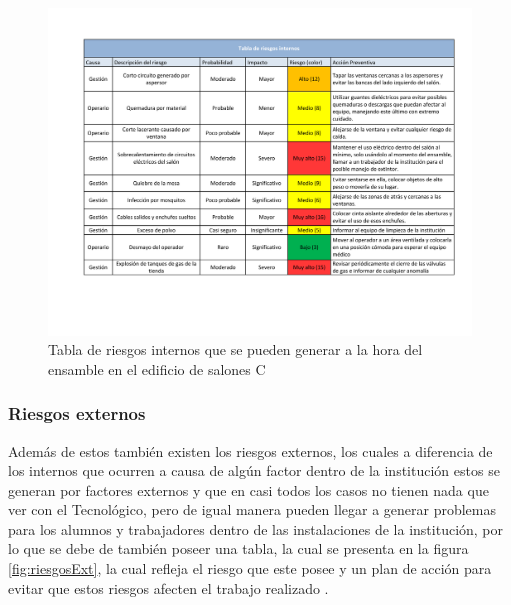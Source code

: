     \begin{figure}[H]
        \centering
        \includegraphics[trim = {20mm 15mm 10mm 20mm},clip,scale=0.35]{19/Img/riesgosInt.pdf}
        \caption{Tabla de riesgos internos que se pueden generar a la hora del ensamble en el edificio de salones C}
        \label{fig:riesgosInt}
    \end{figure}
    
    \subsubsection{Riesgos externos}

     Además de estos también existen los riesgos externos, los cuales a diferencia de los internos que ocurren a causa de algún factor dentro de la institución estos se generan por factores externos y que en casi todos los casos no tienen nada que ver con el Tecnológico, pero de igual manera pueden llegar a generar problemas para los alumnos y trabajadores dentro de las instalaciones de la institución, por lo que se debe de también poseer una tabla, la cual se presenta en la figura \ref{fig:riesgosExt}, la cual refleja el riesgo que este posee y un plan de acción para evitar que estos riesgos afecten el trabajo realizado .

